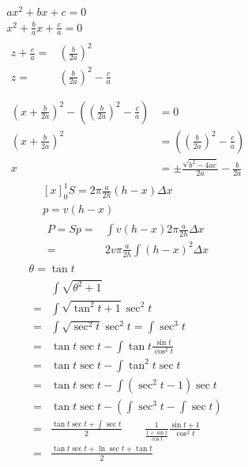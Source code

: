 \documentclass{article}
\begin{document}
  \begin{gather*}
    ax^{2}+bx+c = 0 \\
    x^{2}+\frac{b}{a}x+\frac{c}{a} = 0 \\
    \begin{aligned}
      z+\frac{c}{a} =& \left(\frac{b}{2a}\right)^{2} \\
      z =& \left(\frac{b}{2a}\right)^{2} - \frac{c}{a} \\
    \end{aligned} \\
    \begin{aligned}
      \left(x + \frac{b}{2a}\right)^{2} - \left( \left(\frac{b}{2a}\right)^{2} - \frac{c}{a} \right) &= 0 \\
      \left(x + \frac{b}{2a}\right)^{2} &= \left( \left(\frac{b}{2a}\right)^{2} - \frac{c}{a} \right) \\
      x &= \pm\frac{\sqrt{b^{2}-4ac}}{2a} - \frac{b}{2a}
    \end{aligned}
  \end{gather*}
  \begin{gather*}
    \left[x\right]^{1}_{0}
    S = 2\pi\frac{a}{2h}(h - x)\Delta{x}\\
    p = v(h - x)\\
    \begin{aligned}
      P = Sp =& \int v(h - x)2\pi\frac{a}{2h}\Delta{x} \\
      =&2v\pi\frac{a}{2h}\int (h - x)^{2} \Delta{x}
    \end{aligned}
  \end{gather*}
  \begin{gather*}
    \theta = \tan{t} \\
    \begin{aligned}
      & \int \sqrt{\theta^{2} + 1} \\
      =& \int \sqrt{\tan^{2}{t} + 1} \sec^{2}{t} \\
      =& \int \sqrt{\sec^{2}{t}} \sec^{2}{t} = \int \sec^{3}{t} \\
      =& \tan{t}\sec{t} - \int \tan{t}\frac{\sin{t}}{\cos^{2}{t}} \\
      =& \tan{t}\sec{t} - \int \tan^{2}{t}\sec{t} \\
      =& \tan{t}\sec{t} - \int (\sec^{2}{t} - 1)\sec{t} \\
      =& \tan{t}\sec{t} - ( \int \sec^{3}{t} - \int \sec{t} ) \\
      =& \frac{\tan{t}\sec{t} + \int \sec{t}}{2} \qquad \frac{1}{\frac{1 + \sin{t}}{\cos{t}}}\frac{\sin{t} + 1}{\cos^{2}{t}} \\
      =& \frac{\tan{t}\sec{t} + \ln{\sec{t} + \tan{t}}}{2}
    \end{aligned}
  \end{gather*}
\end{document}
